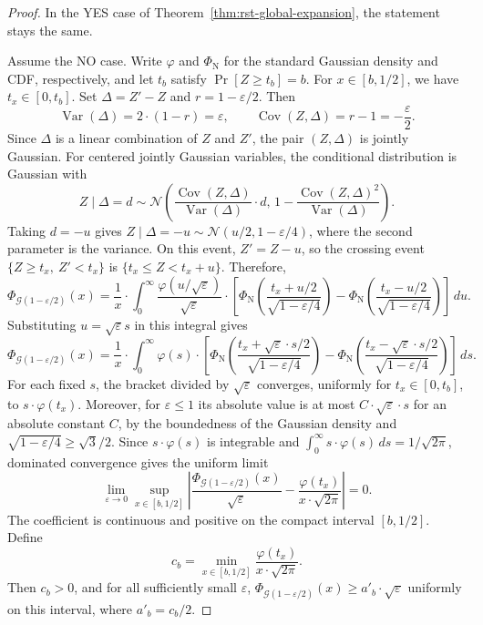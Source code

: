 \begin{proof}
    In the YES case of Theorem~\ref{thm:rst-global-expansion}, the statement stays the same.

    Assume the NO case.
    Write $\varphi$ and $\Phi_{\mathrm N}$ for the standard Gaussian density and CDF, respectively, and let $t_b$ satisfy $\Pr[Z\geq t_b]=b$. For $x\in[b,1/2]$, we have $t_x\in[0,t_b]$. Set $\Delta=Z'-Z$ and $r=1-\varepsilon/2$. Then
    \[
        \operatorname{Var}(\Delta)=2\cdot(1-r)=\varepsilon,
        \qquad
        \operatorname{Cov}(Z,\Delta)=r-1=-\frac{\varepsilon}{2}.
    \]
    Since $\Delta$ is a linear combination of $Z$ and $Z'$, the pair $(Z,\Delta)$ is jointly Gaussian. For centered jointly Gaussian variables, the conditional distribution is Gaussian with
    \[
        Z\mid\Delta=d\sim\mathcal{N}\left(
            \frac{\operatorname{Cov}(Z,\Delta)}{\operatorname{Var}(\Delta)}\cdot d,\,
            1-\frac{\operatorname{Cov}(Z,\Delta)^2}{\operatorname{Var}(\Delta)}
        \right).
    \]
    Taking $d=-u$ gives $Z\mid\Delta=-u\sim\mathcal{N}(u/2,1-\varepsilon/4)$, where the second parameter is the variance. On this event, $Z'=Z-u$, so the crossing event $\{Z\geq t_x,\ Z'<t_x\}$ is $\{t_x\leq Z<t_x+u\}$. Therefore,
    \[
        \Phi_{\mathcal{G}(1-\varepsilon/2)}(x)
        =\frac{1}{x}\cdot\int_0^\infty\frac{\varphi(u/\sqrt{\varepsilon})}{\sqrt{\varepsilon}}\cdot\left[
            \Phi_{\mathrm N}\left(\frac{t_x+u/2}{\sqrt{1-\varepsilon/4}}\right)
            -\Phi_{\mathrm N}\left(\frac{t_x-u/2}{\sqrt{1-\varepsilon/4}}\right)
        \right]\,du.
    \]
    Substituting $u=\sqrt{\varepsilon}s$ in this integral gives
    \[
        \Phi_{\mathcal{G}(1-\varepsilon/2)}(x)
        =\frac{1}{x}\cdot\int_0^\infty\varphi(s)\cdot\left[
            \Phi_{\mathrm N}\left(\frac{t_x+\sqrt{\varepsilon}\cdot s/2}{\sqrt{1-\varepsilon/4}}\right)
            -\Phi_{\mathrm N}\left(\frac{t_x-\sqrt{\varepsilon}\cdot s/2}{\sqrt{1-\varepsilon/4}}\right)
        \right]\,ds.
    \]
    For each fixed $s$, the bracket divided by $\sqrt{\varepsilon}$ converges, uniformly for $t_x\in[0,t_b]$, to $s\cdot\varphi(t_x)$. Moreover, for $\varepsilon\leq1$ its absolute value is at most $C\cdot\sqrt{\varepsilon}\cdot s$ for an absolute constant $C$, by the boundedness of the Gaussian density and $\sqrt{1-\varepsilon/4}\geq\sqrt{3}/2$. Since $s\cdot\varphi(s)$ is integrable and $\int_0^\infty s\cdot\varphi(s)\,ds=1/\sqrt{2\pi}$, dominated convergence gives the uniform limit
    \[
        \lim_{\varepsilon\to0}\sup_{x\in[b,1/2]}
        \left|
            \frac{\Phi_{\mathcal{G}(1-\varepsilon/2)}(x)}{\sqrt{\varepsilon}}
            -\frac{\varphi(t_x)}{x\cdot\sqrt{2\pi}}
        \right|=0.
    \]
    The coefficient is continuous and positive on the compact interval $[b,1/2]$. Define
    \[
        c_b=\min_{x\in[b,1/2]}\frac{\varphi(t_x)}{x\cdot\sqrt{2\pi}}.
    \]
    Then $c_b>0$, and for all sufficiently small $\varepsilon$,
    $\Phi_{\mathcal{G}(1-\varepsilon/2)}(x)\geq a'_b\cdot\sqrt{\varepsilon}$ uniformly on this interval, where $a'_b=c_b/2$.


\end{proof}
